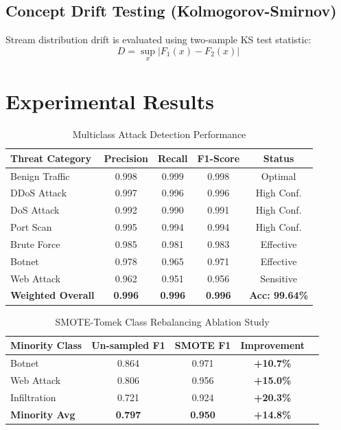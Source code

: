 \documentclass[conference]{IEEEtran}
\begin{document}
\subsection{Concept Drift Testing (Kolmogorov-Smirnov)}
Stream distribution drift is evaluated using two-sample KS test statistic:
\begin{equation}
D = \sup_x |F_1(x) - F_2(x)|
\end{equation}

\section{Experimental Results}

\begin{table}[h]
\centering
\caption{Multiclass Attack Detection Performance}
\label{tab:performance}
\begin{tabular}{lcccc}
\toprule
\textbf{Threat Category} & \textbf{Precision} & \textbf{Recall} & \textbf{F1-Score} & \textbf{Status} \\
\midrule
Benign Traffic & 0.998 & 0.999 & 0.998 & Optimal \\
DDoS Attack & 0.997 & 0.996 & 0.996 & High Conf. \\
DoS Attack & 0.992 & 0.990 & 0.991 & High Conf. \\
Port Scan & 0.995 & 0.994 & 0.994 & High Conf. \\
Brute Force & 0.985 & 0.981 & 0.983 & Effective \\
Botnet & 0.978 & 0.965 & 0.971 & Effective \\
Web Attack & 0.962 & 0.951 & 0.956 & Sensitive \\
\textbf{Weighted Overall} & \textbf{0.996} & \textbf{0.996} & \textbf{0.996} & \textbf{Acc: 99.64\%} \\
\bottomrule
\end{tabular}
\end{table}

\begin{table}[h]
\centering
\caption{SMOTE-Tomek Class Rebalancing Ablation Study}
\label{tab:smote}
\begin{tabular}{lcccc}
\toprule
\textbf{Minority Class} & \textbf{Un-sampled F1} & \textbf{SMOTE F1} & \textbf{Improvement} \\
\midrule
Botnet & 0.864 & 0.971 & \textbf{+10.7\%} \\
Web Attack & 0.806 & 0.956 & \textbf{+15.0\%} \\
Infiltration & 0.721 & 0.924 & \textbf{+20.3\%} \\
\textbf{Minority Avg} & \textbf{0.797} & \textbf{0.950} & \textbf{+14.8\%} \\
\bottomrule
\end{tabular}
\end{table}
\end{document}
